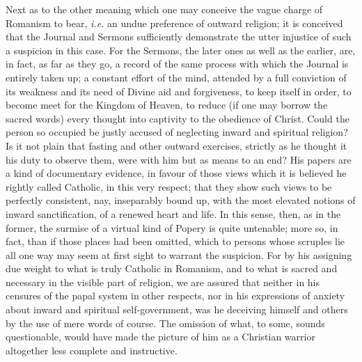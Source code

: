 Next as to the other meaning
which one may conceive the vague charge of Romanism to bear, \emph{i.e.}
an undue preference of outward religion; it is conceived that the
Journal and Sermons sufficiently demonstrate the utter injustice of
such a suspicion in this case. For the Sermons, the later ones as well
as the earlier, are, in fact, as far as they go, a record of the same
process with which the Journal is entirely taken up; a constant effort
of the mind, attended by a full conviction of its weakness and its
need of Divine aid and forgiveness, to keep itself in order, to become
meet for the Kingdom of Heaven, to reduce (if one may borrow the
sacred words) every thought into captivity to the obedience of Christ.
Could the person so occupied be justly accused of neglecting inward
and spiritual religion? Is it not plain that fasting and other outward
exercises, strictly as he thought it his duty to observe them, were
with him but as means to an end? His papers are a kind of documentary
evidence, in favour of those views which it is believed he rightly
called Catholic, in this very respect; that they show such views to be
perfectly consistent, nay, inseparably bound up, with the most
elevated notions of inward sanctification, of a renewed heart and
life. In this sense, then, as in the former, the surmise of a virtual
kind of Popery is quite untenable; more so, in fact, than if
those places had been omitted, which to persons whose scruples lie all
one way may seem at first sight to warrant the suspicion. For by his
assigning due weight to what is truly Catholic in Romanism, and to
what is sacred and necessary in the visible part of religion, we are
assured that neither in his censures of the papal system in other
respects, nor in his expressions of anxiety about inward and spiritual
self-government, was he deceiving himself and others by the use of
mere words of course. The omission of what, to some, sounds
questionable, would have made the picture of him as a Christian
warrior altogether less complete and instructive.

